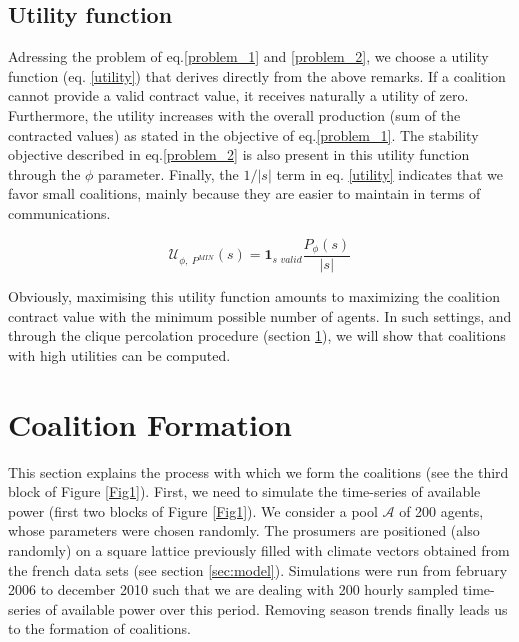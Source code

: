 \documentclass[conference]{IEEEtran}
\begin{document}
\subsection{Utility function}\label{subsec:UtilityFunc}
Adressing the problem of eq.\ref{problem_1} and \ref{problem_2}, we choose a utility function (eq. \ref{utility}) that derives directly from the above remarks. If a coalition cannot provide a valid contract value, it receives naturally a utility of zero. Furthermore, the utility increases with the overall production (sum of the contracted values) as stated in the objective of eq.\ref{problem_1}. The stability objective described in eq.\ref{problem_2} is also present in this utility function through the $ \phi $ parameter. Finally, the $ 1/|s| $ term in eq. \ref{utility} indicates that we favor small coalitions, mainly because they are easier to maintain in terms of communications.

\begin{equation}
 \mathcal{U}_{\phi,\ P^{MIN}}(s) = \mathbf{1}_{\textit{s\ valid}} \dfrac{P_{\phi}(s)}{|s|} 
\label{utility}
\end{equation}

Obviously, maximising this utility function amounts to maximizing the coalition contract value with the minimum possible number of agents. In such settings, and through the clique percolation procedure (section \ref{sec:forming}), we will show that coalitions with high utilities can be computed.

%
%

\section{Coalition Formation}
\label{sec:forming}

This section explains the process with which we form the coalitions (see the third block of Figure \ref{Fig1}). First, we need to simulate the time-series of available power (first two blocks of Figure \ref{Fig1}). We consider a pool $ \mathcal{A} $ of 200 agents, whose parameters were chosen randomly. The prosumers are positioned (also randomly) on a square lattice previously filled with climate vectors obtained from the french data sets (see section \ref{sec:model}). Simulations were run from february 2006 to december 2010 such that we are dealing with 200 hourly sampled time-series of available power over this period. Removing season trends finally leads us to the formation of coalitions. 
\end{document}
